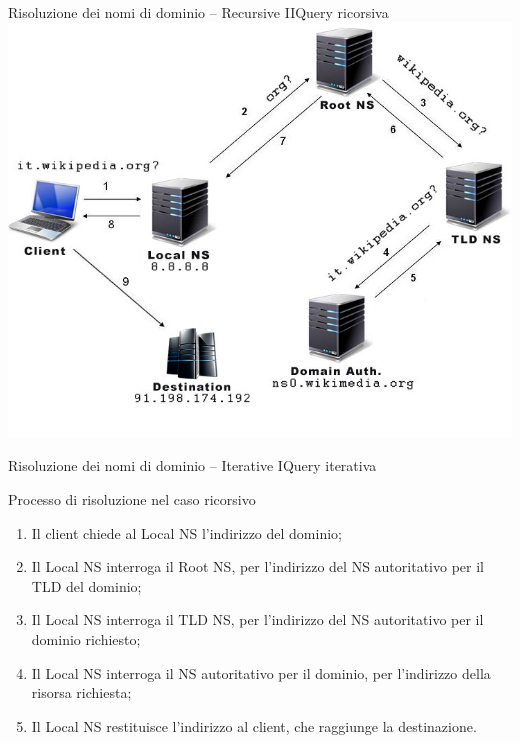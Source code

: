 \documentclass[italian]{beamer}
\begin{document}
\begin{frame}{Risoluzione dei nomi di dominio -- Recursive II}{Query ricorsiva}
\centering\includegraphics[height=0.8\textheight]{img/dns-risoluzione-ricorsiva}
\end{frame}

\begin{frame}{Risoluzione dei nomi di dominio -- Iterative I}{Query iterativa}
\begin{block}{Processo di risoluzione nel caso ricorsivo}
\begin{enumerate}
\item Il client chiede al Local NS l'indirizzo del dominio;
\item Il Local NS interroga il Root NS, per l'indirizzo del NS autoritativo per il TLD del dominio;
\item Il Local NS interroga il TLD NS, per l'indirizzo del NS autoritativo per il dominio richiesto;
\item Il Local NS interroga il NS autoritativo per il dominio, per l'indirizzo della risorsa richiesta;
\item Il Local NS restituisce l'indirizzo al client, che raggiunge la destinazione.
\end{enumerate}
\end{block}
\end{frame}
\end{document}
